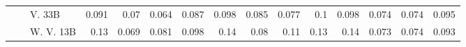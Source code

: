 \begin{table}[!htbp]
{\begin{tabular}{l|l|l|rrrr|rrrr|rrrr}
 &  & V. 33B  & {\cellcolor[HTML]{ACDEA6}} \color[HTML]{000000} 0.091 & {\cellcolor[HTML]{CBEBC5}} \color[HTML]{000000} 0.07 & {\cellcolor[HTML]{D2EDCC}} \color[HTML]{000000} 0.064 & {\cellcolor[HTML]{B1E0AB}} \color[HTML]{000000} 0.087 & {\cellcolor[HTML]{FDD7AF}} \color[HTML]{000000} 0.098 & {\cellcolor[HTML]{FEDEBF}} \color[HTML]{000000} 0.085 & {\cellcolor[HTML]{FEE3C8}} \color[HTML]{000000} 0.077 & {\cellcolor[HTML]{FDD3A7}} \color[HTML]{000000} 0.1 & {\cellcolor[HTML]{ACAAD1}} \color[HTML]{000000} 0.098 & {\cellcolor[HTML]{CECEE5}} \color[HTML]{000000} 0.074 & {\cellcolor[HTML]{CECEE5}} \color[HTML]{000000} 0.074 & {\cellcolor[HTML]{B0AFD4}} \color[HTML]{000000} 0.095 \\
 &  & W. V. 13B  & {\cellcolor[HTML]{63BC6E}} \color[HTML]{F1F1F1} 0.13 & {\cellcolor[HTML]{CCEBC6}} \color[HTML]{000000} 0.069 & {\cellcolor[HTML]{BCE4B5}} \color[HTML]{000000} 0.081 & {\cellcolor[HTML]{A0D99B}} \color[HTML]{000000} 0.098 & {\cellcolor[HTML]{FDAE6A}} \color[HTML]{000000} 0.14 & {\cellcolor[HTML]{FEE1C4}} \color[HTML]{000000} 0.08 & {\cellcolor[HTML]{FDD1A4}} \color[HTML]{000000} 0.11 & {\cellcolor[HTML]{FDBA7F}} \color[HTML]{000000} 0.13 & {\cellcolor[HTML]{7970B3}} \color[HTML]{F1F1F1} 0.14 & {\cellcolor[HTML]{CFD0E6}} \color[HTML]{000000} 0.073 & {\cellcolor[HTML]{CECEE5}} \color[HTML]{000000} 0.074 & {\cellcolor[HTML]{B3B3D6}} \color[HTML]{000000} 0.093 \\


\end{tabular}}
\end{table}
